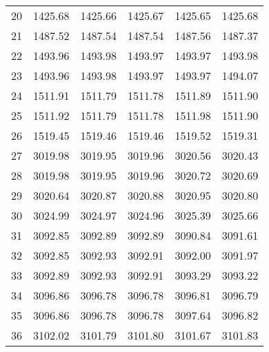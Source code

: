 \documentclass[10pt,oneside]{article}
\begin{document}
\begin{table}[h!]
\begin{tabular}{cccccc}
20 &   1425.68 & 1425.66 &    1425.67 & 1425.65 &   1425.68 \\
21 &   1487.52 & 1487.54 &    1487.54 & 1487.56 &   1487.37 \\
22 &   1493.96 & 1493.98 &    1493.97 & 1493.97 &   1493.98 \\
23 &   1493.96 & 1493.98 &    1493.97 & 1493.97 &   1494.07 \\
24 &   1511.91 & 1511.79 &    1511.78 & 1511.89 &   1511.90 \\
25 &   1511.92 & 1511.79 &    1511.78 & 1511.98 &   1511.90 \\
26 &   1519.45 & 1519.46 &    1519.46 & 1519.52 &   1519.31 \\
27 &   3019.98 & 3019.95 &    3019.96 & 3020.56 &   3020.43 \\
28 &   3019.98 & 3019.95 &    3019.96 & 3020.72 &   3020.69 \\
29 &   3020.64 & 3020.87 &    3020.88 & 3020.95 &   3020.80 \\
30 &   3024.99 & 3024.97 &    3024.96 & 3025.39 &   3025.66 \\
31 &   3092.85 & 3092.89 &    3092.89 & 3090.84 &   3091.61 \\
32 &   3092.85 & 3092.93 &    3092.91 & 3092.00 &   3091.97 \\
33 &   3092.89 & 3092.93 &    3092.91 & 3093.29 &   3093.22 \\
34 &   3096.86 & 3096.78 &    3096.78 & 3096.81 &   3096.79 \\
35 &   3096.86 & 3096.78 &    3096.78 & 3097.64 &   3096.82 \\
36 &   3102.02 & 3101.79 &    3101.80 & 3101.67 &   3101.83 \\
\bottomrule
\end{tabular}
\end{table}
\end{document}
